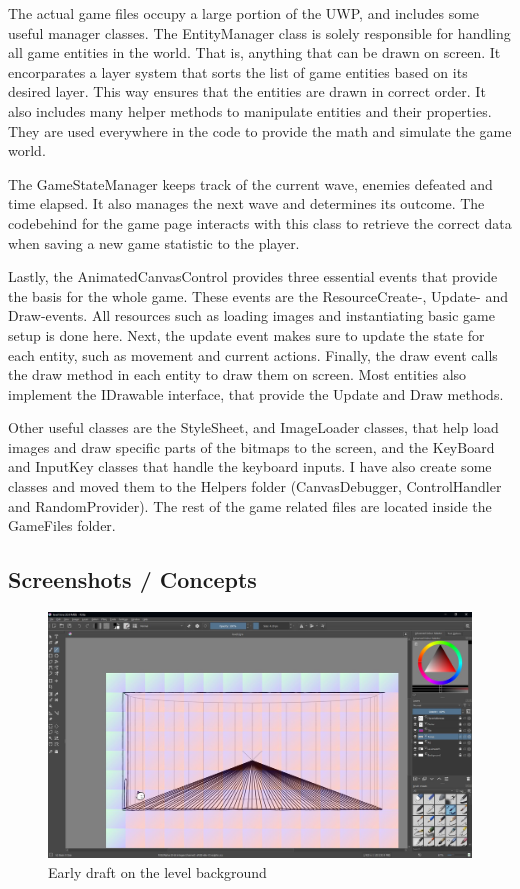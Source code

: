 \documentclass[12pt]{article}
\begin{document}
        The actual game files occupy a large portion of the UWP, and includes some useful manager classes. The EntityManager class is solely responsible for handling all game entities in the world. That is, anything that can be drawn on screen. It encorparates a layer system that sorts the list of game entities based on its desired layer. This way ensures that the entities are drawn in correct order. It also includes many helper methods to manipulate entities and their properties. They are used everywhere in the code to provide the math and simulate the game world.

        The GameStateManager keeps track of the current wave, enemies defeated and time elapsed. It also manages the next wave and determines its outcome. The codebehind for the game page interacts with this class to retrieve the correct data when saving a new game statistic to the player.

        Lastly, the AnimatedCanvasControl provides three essential events that provide the basis for the whole game. These events are the ResourceCreate-, Update- and Draw-events. All resources such as loading images and instantiating basic game setup is done here. Next, the update event makes sure to update the state for each entity, such as movement and current actions. Finally, the draw event calls the draw method in each entity to draw them on screen. Most entities also implement the IDrawable interface, that provide the Update and Draw methods.

        Other useful classes are the StyleSheet, and ImageLoader classes, that help load images and draw specific parts of the bitmaps to the screen, and the KeyBoard and InputKey classes that handle the keyboard inputs. I have also create some classes and moved them to the Helpers folder (CanvasDebugger, ControlHandler and RandomProvider). The rest of the game related files are located inside the GameFiles folder.

\subsection{Screenshots / Concepts}

\begin{figure}[H]
    \centering
    \includegraphics[max width=\textwidth]{images/002.JPG}
    \caption{Early draft on the level background}
\end{figure}
\end{document}

